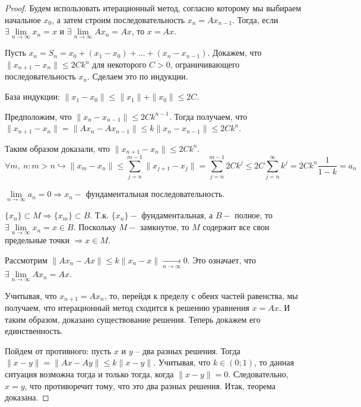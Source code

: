 \begin{proof}
	Будем использовать итерационный метод, согласно которому мы выбираем начальное $x_0$, а затем строим последовательность $x_n = Ax_{n-1}$. Тогда, если $\exists \lim\limits_{n \rightarrow \infty} x_n = x$ и $\exists \lim\limits_{n \rightarrow \infty} Ax_n = Ax$, то $x = Ax$.
	
		Пусть $x_n = S_n = x_0 + (x_1 - x_0) + \ldots + (x_n - x_{n-1})$.
		Докажем, что $\|x_{n+1} - x_n\| \leqslant 2Ck^n$ для некоторого $C > 0$, ограничивающего последовательность $x_n$. Сделаем это по индукции.
		
		База индукции: $\|x_1 - x_0\| \leqslant \|x_1\| + \|x_0\| \leqslant 2C$.
		
		Предположим, что $\|x_n - x_{n-1}\| \leqslant 2Ck^{n-1}$. Тогда получаем, что $\|x_{n+1} - x_n\| = \|Ax_n - Ax_{n-1}\| \leqslant k \|x_n - x_{n-1}\| \leqslant 2Ck^n$.
		
		Таким образом доказали, что $ \|x_{n+1} - x_n\| \leqslant 2Ck^n $.
		 $$\forall m,~ n: m > n \hookrightarrow \|x_m - x_n\| \leq \sum\limits_{j = n}^{m-1} {\|x_{j + 1} - x_j\|} = \sum\limits_{j = n}^{m-1} {2Ck^j} \leq 2C\sum\limits_{j = n}^{\infty} {k^j} = 2Ck^n \frac{1}{1 - k} = a_n$$
		
	$\lim\limits_{n \to \infty}{a_n} = 0 \Rightarrow x_n - $ фундаментальная последовательность.
	
	$\{x_n\} \subset M \Rightarrow \{x_m\} \subset B$. Т.к. $\{x_n\} - $ фундаментальная, а $B - $ полное, то $\exists \lim\limits_{n \rightarrow \infty} x_n = x \in B$. Поскольку $M - $ замкнутое, то $M$ содержит все свои предельные точки $\Rightarrow x \in M$.
		
		Рассмотрим $\|Ax_n - Ax\| \leqslant k\|x_n - x\| \underset{n \rightarrow \infty}{\longrightarrow} 0$. Это означает, что $\exists \lim\limits_{n \rightarrow \infty} Ax_n = Ax$. 
		
		Учитывая, что $x_{n+1} = Ax_n$, то, перейдя к пределу с обеих частей равенства, мы получаем, что итерационный метод сходится к решению уравнения $x = Ax$. И таким образом, доказано существование решения. Теперь докажем его единственность.
		
		Пойдем от противного: пусть $x$ и $y$ -- два разных решения. Тогда $\|x - y\| = \|Ax - Ay\| \leqslant k \|x - y\|$. Учитывая, что $k \in (0; 1)$, то данная ситуация возможна тогда и только тогда, когда $\|x - y\| = 0$. Следовательно, $x = y$, что противоречит тому, что это два разных решения. Итак, теорема доказана.
\end{proof}
